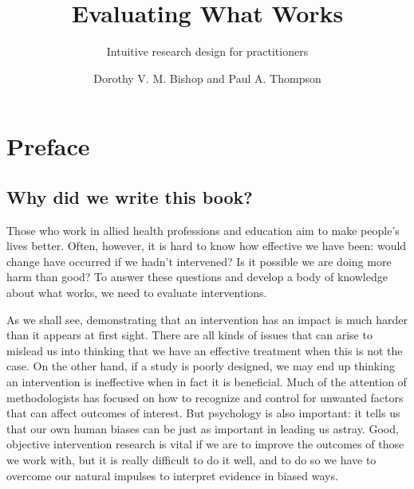 \documentclass{krantz}
\title{Evaluating What Works}
\subtitle{Intuitive research design for practitioners}
\author{Dorothy V. M. Bishop and Paul A. Thompson}
\begin{document}
\setcounter{page}{1}
\frontmatter
\maketitle
\setcounter{page}{1} %

\tableofcontents





%
%




\chapter*{Preface}\label{preface}


\hypertarget{why-did-we-write-this-book}{%
\section*{Why did we write this book?}\label{why-did-we-write-this-book}}


Those who work in allied health professions and education aim to make people's lives better. Often, however, it is hard to know how effective we have been: would change have occurred if we hadn't intervened? Is it possible we are doing more harm than good? To answer these questions and develop a body of knowledge about what works, we need to evaluate interventions.

As we shall see, demonstrating that an intervention has an impact is much harder than it appears at first sight. There are all kinds of issues that can arise to mislead us into thinking that we have an effective treatment when this is not the case. On the other hand, if a study is poorly designed, we may end up thinking an intervention is ineffective when in fact it is beneficial. Much of the attention of methodologists has focused on how to recognize and control for unwanted factors that can affect outcomes of interest. But psychology is also important: it tells us that our own human biases can be just as important in leading us astray. Good, objective intervention research is vital if we are to improve the outcomes of those we work with, but it is really difficult to do it well, and to do so we have to overcome our natural impulses to interpret evidence in biased ways.
\end{document}
